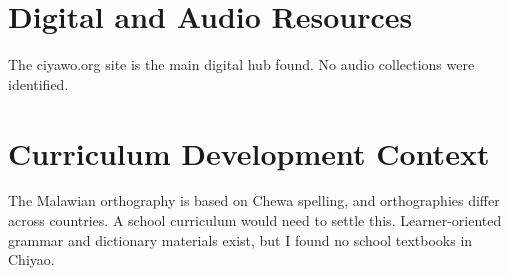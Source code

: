 \documentclass[12pt]{article}
\begin{document}
\section{Digital and Audio Resources}
The ciyawo.org site is the main digital hub found. No audio collections were identified.

\section{Curriculum Development Context}
The Malawian orthography is based on Chewa spelling, and orthographies differ across countries. A school curriculum would need to settle this. Learner-oriented grammar and dictionary materials exist, but I found no school textbooks in Chiyao.
\end{document}

